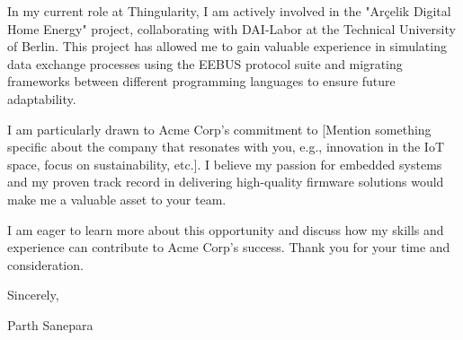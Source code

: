 \documentclass[letterpaper,11pt]{article}
\newcommand{\CompanyName}{Acme Corp}
\newcommand{\CurrentCompany}{Thingularity}
\begin{document}
  In my current role at \CurrentCompany{}, I am actively involved in the "Arçelik Digital Home Energy" project, collaborating with 
  DAI-Labor at the Technical University of Berlin. This project has allowed me to gain valuable experience in simulating data 
  exchange processes using the EEBUS protocol suite and migrating frameworks between different programming languages to ensure 
  future adaptability. \\ \vspace{3pt}

  I am particularly drawn to \CompanyName{}'s commitment to [Mention something specific about the company that resonates with you, 
  e.g., innovation in the IoT space, focus on sustainability, etc.]. I believe my passion for embedded systems and my proven track 
  record in delivering high-quality firmware solutions would make me a valuable asset to your team. \\ \vspace{3pt}

  I am eager to learn more about this opportunity and discuss how my skills and experience can contribute to \CompanyName{}'s success. 
  Thank you for your time and consideration.

\vspace{1cm}

  Sincerely,

  Parth Sanepara



\end{document}
